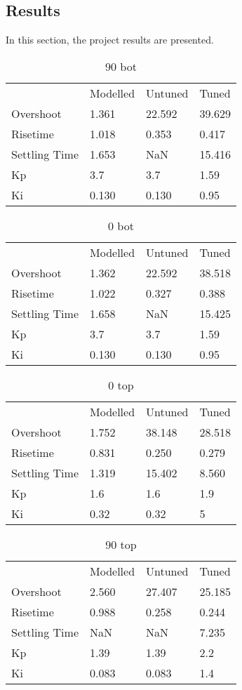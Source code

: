 \documentclass[../../main]{subfiles}
\begin{document}
\subsection{Results}
\label{sec:results}
In this section, the project results are presented.

\begin{table}[h]
	\centering
	\begin{tabular}{*{4}{l}}
		&Modelled&Untuned&Tuned\\
		Overshoot&1.361&22.592&39.629\\
		Risetime& 1.018&0.353&0.417\\
		Settling Time& 1.653&NaN& 15.416\\
		Kp&3.7&3.7&1.59\\
		Ki&0.130&0.130&0.95
	\end{tabular}
	\caption{90 bot}
	\label{tab:90_bot}
\end{table}

\begin{table}[h]
	\centering
	\begin{tabular}{*{4}{l}}
		&Modelled&Untuned&Tuned\\
		Overshoot&1.362&22.592&38.518\\
		Risetime&1.022&0.327&0.388\\
		Settling Time&1.658&NaN&15.425\\
		Kp&3.7&3.7&1.59\\
		Ki&0.130&0.130&0.95
	\end{tabular}
	\caption{0 bot}
	\label{tab:0_bot}
\end{table}


\begin{table}[h]
	\centering
	\begin{tabular}{*{4}{l}}
		&Modelled&Untuned&Tuned\\
		Overshoot&1.752&38.148&28.518\\
		Risetime&0.831&0.250&0.279\\
		Settling Time&1.319&15.402&8.560\\
		Kp&1.6&1.6&1.9\\
		Ki&0.32&0.32&5
	\end{tabular}
	\caption{0 top}
	\label{tab:0_top}
\end{table}


\begin{table}[h]
	\centering
	\begin{tabular}{*{4}{l}}
		&Modelled&Untuned&Tuned\\
		Overshoot&2.560&27.407&25.185\\
		Risetime&0.988&0.258&0.244\\
		Settling Time&NaN&NaN&7.235\\
		Kp&1.39&1.39&2.2\\
		Ki&0.083&0.083&1.4
	\end{tabular}
	\caption{90 top}
	\label{tab:90_top}
\end{table}
\end{document}
